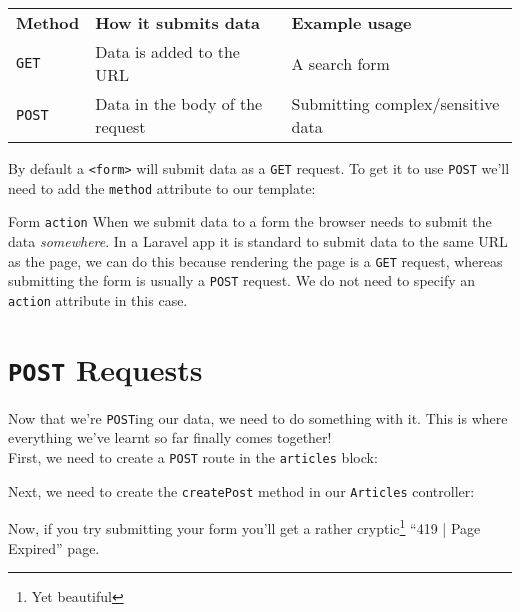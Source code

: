 \begin{tabularx}{\textwidth}{l l X}
    \textbf{Method} & \textbf{How it submits data}       & \textbf{Example usage} \\
    \texttt{GET}    & Data is added to the URL           & A search form \\
    \texttt{POST}   & Data in the body of the request    & Submitting complex/sensitive data \\
\end{tabularx}

\par\bigskip

By default a \texttt{<form>} will submit data as a \texttt{GET} request. To get it to use \texttt{POST} we'll need to add the \texttt{method} attribute to our template:



\begin{infobox}{Form \texttt{action}}
    When we submit data to a form the browser needs to submit the data \textit{somewhere}. In a Laravel app it is standard to submit data to the same URL as the page, we can do this because rendering the page is a \texttt{GET} request, whereas submitting the form is usually a \texttt{POST} request. We do not need to specify an \texttt{action} attribute in this case.
\end{infobox}


\section{\texttt{POST} Requests}

Now that we're \texttt{POST}ing our data, we need to do something with it. This is where everything we've learnt so far finally comes together!
\\

First, we need to create a \texttt{POST} route in the \texttt{articles} block:


Next, we need to create the \texttt{createPost} method in our \texttt{Articles} controller:


Now, if you try submitting your form you'll get a rather cryptic\footnote{Yet beautiful} ``419 | Page Expired'' page.
\\

